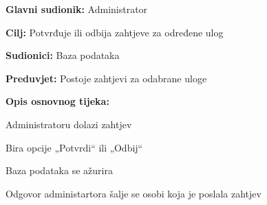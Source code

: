 					\noindent {}
					\begin{packed_item}
	
						\item \textbf{Glavni sudionik: }  Administrator
						\item  \textbf{Cilj:} Potvrđuje ili odbija zahtjeve za određene ulog
						\item  \textbf{Sudionici:} Baza podataka
						\item  \textbf{Preduvjet:} Postoje zahtjevi za odabrane uloge
						\item  \textbf{Opis osnovnog tijeka:} 
						
						
						\item[] \begin{packed_enum}
	
							\item Administratoru dolazi zahtjev
							\item Bira opcije „Potvrdi“ ili „Odbij“
							\item Baza podataka se ažurira
							\item Odgovor administartora šalje se osobi koja je poslala zahtjev
							
						\end{packed_enum}
					\end{packed_item}
					\noindent {}
